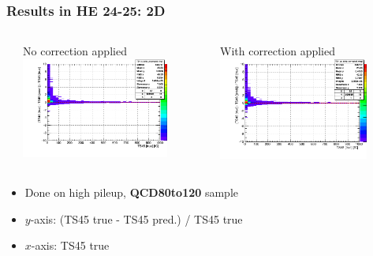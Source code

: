 \documentclass[bigger]{beamer}
\providecommand{\alert}[1]{\textbf{#1}}
\begin{document}
\begin{frame}
\frametitle{Results in HE 24-25: 2D}
\label{sec-3-3-13}
\begin{columns} %
\label{sec-3-3-13-1}
\begin{column}{0.55\textwidth}
\label{sec-3-3-13-1-1}

\centering
No correction applied
\includegraphics[width=0.8\textwidth]{fig/delta_uncorrected_QCD80to120_ring_3.png}
\end{column}
\begin{column}{0.55\textwidth}
\label{sec-3-3-13-1-2}

\centering
With correction applied
\includegraphics[width=0.8\textwidth]{fig/delta_corrected_QCD80to120_ring_3.png}
\end{column}
\end{columns}
\label{sec-3-3-13-2}
\begin{itemize}

\item Done on high pileup, \alert{QCD80to120} sample
\label{sec-3-3-13-2-1}%

\item $y$-axis: (TS45 true - TS45 pred.) / TS45 true
\label{sec-3-3-13-2-2}%

\item $x$-axis: TS45 true
\label{sec-3-3-13-2-3}%

\end{itemize} %
\end{frame}
\end{document}
